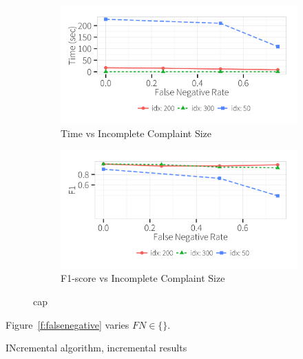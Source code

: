   \begin{figure}[h!]
    \centering
    \begin{subfigure}[t]{\columnwidth}
    \includegraphics[width = .9\columnwidth]{figures/noise_fn_time}
    \caption{Time vs Incomplete Complaint Size}
    \label{f:falsenegative_time} 
    \end{subfigure}
    \begin{subfigure}[t]{\columnwidth}
    \includegraphics[width = .9\columnwidth]{figures/noise_fn_acc}
    \caption{F1-score vs Incomplete Complaint Size}
    \label{f:falsenegative_acc} 
    \end{subfigure}
    \caption{cap}
  \end{figure}

Figure~\ref{f:falsenegative} varies $FN \in \{\}$.

INcremental algorithm, incremental results














